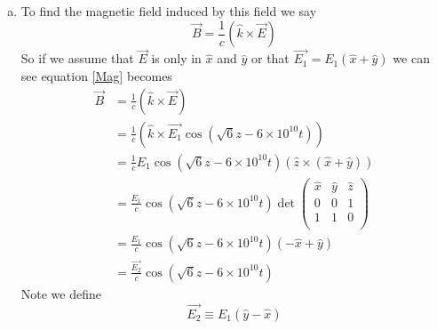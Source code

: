 \documentclass[11pt]{article}
\numberwithin{equation}{section}
\begin{document}
\begin{enumerate}[(a)]
\item
To find the magnetic field induced by this field we say
\begin{equation}
\vec{B} = \frac{1}{c}(\hat{k}\times\vec{E})
\label{Mag}
\end{equation}
So if we assume that $\vec{E}$ is only in $\hat{x}$ and $\hat{y}$ or that $\vec{E_1}=E_1(\hat{x}+\hat{y})$ we can see equation \ref{Mag} becomes
\begin{align*}
\vec{B} &= \frac{1}{c}(\hat{k}\times\vec{E})\\
&= \frac{1}{c}\left(\hat{k}\times\vec{E_1}\cos\left(\sqrt{6}z-6\times10^{10}t\right)\right)\\
&= \frac{1}{c}E_1\cos\left(\sqrt{6}z-6\times10^{10}t\right)\left(\hat{z}\times(\hat{x}+\hat{y})\right)\\
&= \frac{E_1}{c}\cos\left(\sqrt{6}z-6\times10^{10}t\right)\det\left(\begin{array}{ccc}
\hat{x}		&\hat{y}	&\hat{z}\\
0		&0		&1	\\
1		&1		&0	\\
\end{array}\right)\\
&= \frac{E_1}{c}\cos\left(\sqrt{6}z-6\times10^{10}t\right)(-\hat{x}+\hat{y})\\
&= \frac{\vec{E_2}}{c}\cos\left(\sqrt{6}z-6\times10^{10}t\right)
\end{align*}
Note we define 
$$\vec{E_2}\equiv E_1(\hat{y}-\hat{x})$$
\end{enumerate}
\end{document}
